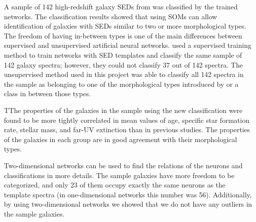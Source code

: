 A sample of 142 high-redshift galaxy SEDs from  was classified by the trained networks.
The classification results showed that using SOMs can allow identification of galaxies with SEDs similar to two or more morphological types.
The freedom of having in-between types is one of the main differences between supervised and unsupervised artificial neural networks.
 used a supervised training method to train networks with  SED templates and classify the same sample of 142 galaxy spectra;
however, they could not classify 37 out of 142 spectra.
The unsupervised method used in this project was able to classify  all 142 spectra in the sample
as belonging to one of the morphological types introduced by  or a class in between those types.

TThe properties of the galaxies in the  sample using the new classification were found to be more tightly correlated in mean values of age, specific star formation rate, stellar mass, and far-UV extinction than in previous studies. 
The properties of the galaxies in each group are in good agreement with their morphological types.

Two-dimensional networks can be used to find the relations of the neurons and classifications in more details.
The sample galaxies have more freedom to be categorized, and only 23 of them occupy exactly the same neurons as the  template spectra (in one-dimensional networks this number was 56).
Additionally, by using two-dimensional networks we showed that we do not have any outliers in the sample galaxies.




